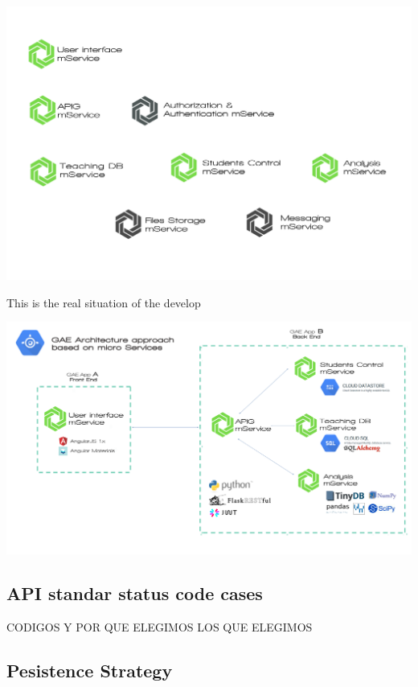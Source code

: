 \begin{center}
\includegraphics[scale=0.22]{img/graphics/final_microservices_distribution.png}
\end{center}

This is the real situation of the develop

\begin{center}
\includegraphics[scale=0.15]{img/graphics/GAE_final_architecture.png}
\end{center}

\subsection{API standar status code cases}

CODIGOS Y POR QUE ELEGIMOS LOS QUE ELEGIMOS

\subsection{Pesistence Strategy}

